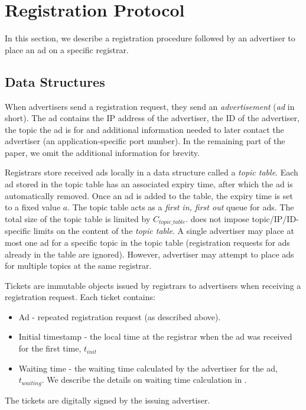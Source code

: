 \section{Registration Protocol}\label{sec:registration}
In this section, we describe a registration procedure followed by an advertiser to place an ad on a specific registrar. 
\subsection{Data Structures}
When advertisers send a registration request, they send an \emph{advertisement} (\emph{ad} in short). The ad contains the IP address of the advertiser, the ID of the advertiser, the topic the ad is for and additional information needed to later contact the advertiser (\eg an application-specific port number). In the remaining part of the paper, we omit the additional information for brevity. 

Registrars store received ads locally in a data structure called a \emph{topic table}. Each ad stored in the topic table has an associated expiry time, after which the ad is automatically removed. Once an ad is added to the table, the expiry time is set to a fixed value $a$. The topic table acts as a \emph{first in, first out} queue for ads. The total size of the topic table is limited by $C_\textit{topic\_table}$. \sysname does not impose topic/IP/ID-specific limits on the content of the \emph{topic table}. 
A single advertiser may place at most one ad for a specific topic in the topic table (registration requests for ads already in the table are ignored). However, advertiser may attempt to place ads for multiple topics at the same registrar.

Tickets are immutable objects issued by registrars to advertisers when receiving a registration request. Each ticket contains:
\begin{itemize}
    \item Ad - repeated registration request (as described above). 
    \item Initial timestamp - the local time at the registrar when the ad was received for the first time, $t_\textit{init}$
    \item Waiting time - the waiting time calculated by the advertiser for the ad, $t_\textit{waiting}$. We describe the details on waiting time calculation in . 
\end{itemize}
The tickets are digitally signed by the issuing advertiser. 

